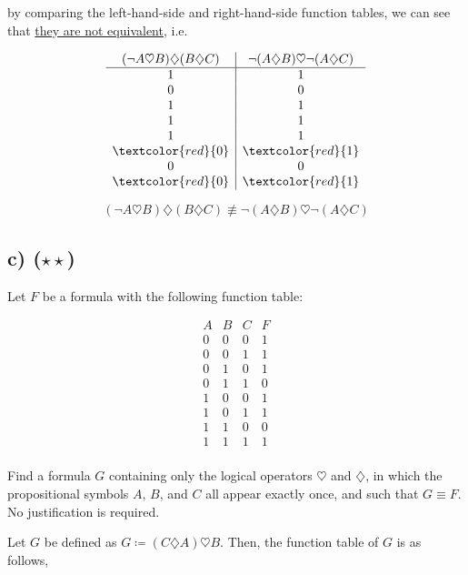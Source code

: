 \documentclass[unicode,11pt,a4paper,oneside,numbers=endperiod,openany]{scrartcl}
\begin{document}
by comparing the left-hand-side and right-hand-side function tables, 
we can see that \underline{they are not equivalent}, i.e. 

\[
\begin{array}{c|c}
(\neg A \heartsuit B) \diamondsuit (B \diamondsuit C) 
& \neg(A \diamondsuit B) \heartsuit \neg(A \diamondsuit C) \\
\hline
1 & 1 \\
0 & 0 \\
1 & 1 \\
1 & 1 \\
1 & 1 \\
\textcolor{red}{0} & \textcolor{red}{1} \\
0 & 0 \\
\textcolor{red}{0} & \textcolor{red}{1} \\
\end{array}
\]

\[
(\neg A \heartsuit B) \diamondsuit (B \diamondsuit C) 
\not\equiv 
\neg(A \diamondsuit B) \heartsuit \neg(A \diamondsuit C)
\]

    
\subsection*{c) (\(\star \star\))} 
Let \( F \) be a formula with the following function table:

\[
\begin{array}{c|c|c||c}
A & B & C & F \\
\hline
0 & 0 & 0 & 1 \\
0 & 0 & 1 & 1 \\
0 & 1 & 0 & 1 \\
0 & 1 & 1 & 0 \\
1 & 0 & 0 & 1 \\
1 & 0 & 1 & 1 \\
1 & 1 & 0 & 0 \\
1 & 1 & 1 & 1 \\
\end{array}
\]

\noindent Find a formula \( G \) containing only the logical operators \(\heartsuit\) and \(\diamondsuit\), 
in which the propositional symbols \( A \), \( B \), and \( C \) all appear exactly once, 
and such that \( G \equiv F \). 
No justification is required.
\\\newline

Let \( G \) be defined as \( G \coloneq (C \diamondsuit A) \heartsuit B \).
Then, the function table of \( G \) is as follows,
\end{document}
